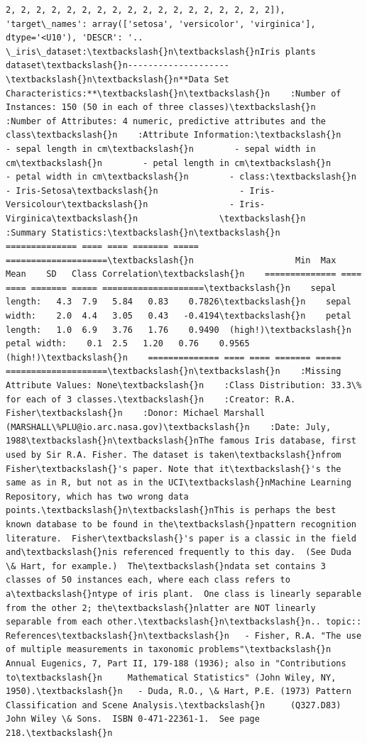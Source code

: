 \documentclass[11pt]{article}
\begin{document}
\begin{Verbatim}[commandchars=\\\{\}]
       2, 2, 2, 2, 2, 2, 2, 2, 2, 2, 2, 2, 2, 2, 2, 2, 2, 2]), 'target\_names': array(['setosa', 'versicolor', 'virginica'], dtype='<U10'), 'DESCR': '.. \_iris\_dataset:\textbackslash{}n\textbackslash{}nIris plants dataset\textbackslash{}n--------------------\textbackslash{}n\textbackslash{}n**Data Set Characteristics:**\textbackslash{}n\textbackslash{}n    :Number of Instances: 150 (50 in each of three classes)\textbackslash{}n    :Number of Attributes: 4 numeric, predictive attributes and the class\textbackslash{}n    :Attribute Information:\textbackslash{}n        - sepal length in cm\textbackslash{}n        - sepal width in cm\textbackslash{}n        - petal length in cm\textbackslash{}n        - petal width in cm\textbackslash{}n        - class:\textbackslash{}n                - Iris-Setosa\textbackslash{}n                - Iris-Versicolour\textbackslash{}n                - Iris-Virginica\textbackslash{}n                \textbackslash{}n    :Summary Statistics:\textbackslash{}n\textbackslash{}n    ============== ==== ==== ======= ===== ====================\textbackslash{}n                    Min  Max   Mean    SD   Class Correlation\textbackslash{}n    ============== ==== ==== ======= ===== ====================\textbackslash{}n    sepal length:   4.3  7.9   5.84   0.83    0.7826\textbackslash{}n    sepal width:    2.0  4.4   3.05   0.43   -0.4194\textbackslash{}n    petal length:   1.0  6.9   3.76   1.76    0.9490  (high!)\textbackslash{}n    petal width:    0.1  2.5   1.20   0.76    0.9565  (high!)\textbackslash{}n    ============== ==== ==== ======= ===== ====================\textbackslash{}n\textbackslash{}n    :Missing Attribute Values: None\textbackslash{}n    :Class Distribution: 33.3\% for each of 3 classes.\textbackslash{}n    :Creator: R.A. Fisher\textbackslash{}n    :Donor: Michael Marshall (MARSHALL\%PLU@io.arc.nasa.gov)\textbackslash{}n    :Date: July, 1988\textbackslash{}n\textbackslash{}nThe famous Iris database, first used by Sir R.A. Fisher. The dataset is taken\textbackslash{}nfrom Fisher\textbackslash{}'s paper. Note that it\textbackslash{}'s the same as in R, but not as in the UCI\textbackslash{}nMachine Learning Repository, which has two wrong data points.\textbackslash{}n\textbackslash{}nThis is perhaps the best known database to be found in the\textbackslash{}npattern recognition literature.  Fisher\textbackslash{}'s paper is a classic in the field and\textbackslash{}nis referenced frequently to this day.  (See Duda \& Hart, for example.)  The\textbackslash{}ndata set contains 3 classes of 50 instances each, where each class refers to a\textbackslash{}ntype of iris plant.  One class is linearly separable from the other 2; the\textbackslash{}nlatter are NOT linearly separable from each other.\textbackslash{}n\textbackslash{}n.. topic:: References\textbackslash{}n\textbackslash{}n   - Fisher, R.A. "The use of multiple measurements in taxonomic problems"\textbackslash{}n     Annual Eugenics, 7, Part II, 179-188 (1936); also in "Contributions to\textbackslash{}n     Mathematical Statistics" (John Wiley, NY, 1950).\textbackslash{}n   - Duda, R.O., \& Hart, P.E. (1973) Pattern Classification and Scene Analysis.\textbackslash{}n     (Q327.D83) John Wiley \& Sons.  ISBN 0-471-22361-1.  See page 218.\textbackslash{}n   
\end{Verbatim}
\end{document}
